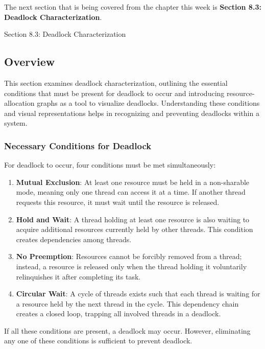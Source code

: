 The next section that is being covered from the chapter this week is \textbf{Section 8.3: Deadlock Characterization}.

\begin{notes}{Section 8.3: Deadlock Characterization}
    \subsection*{Overview}

    This section examines deadlock characterization, outlining the essential conditions that must be present for deadlock to occur and introducing resource-allocation graphs as a tool to visualize deadlocks. Understanding these conditions and visual representations helps in recognizing and preventing deadlocks within a system.
    
    \subsubsection*{Necessary Conditions for Deadlock}
    
    For deadlock to occur, four conditions must be met simultaneously:

    \begin{enumerate}
        \item \textbf{Mutual Exclusion}: At least one resource must be held in a non-sharable mode, meaning only one thread can access it at a time. If another thread requests this resource, it must wait until the resource is released.
        \item \textbf{Hold and Wait}: A thread holding at least one resource is also waiting to acquire additional resources currently held by other threads. This condition creates dependencies among threads.
        \item \textbf{No Preemption}: Resources cannot be forcibly removed from a thread; instead, a resource is released only when the thread holding it voluntarily relinquishes it after completing its task.
        \item \textbf{Circular Wait}: A cycle of threads exists such that each thread is waiting for a resource held by the next thread in the cycle. This dependency chain creates a closed loop, trapping all involved threads in a deadlock.
    \end{enumerate}
    
    If all these conditions are present, a deadlock may occur. However, eliminating any one of these conditions is sufficient to prevent deadlock.
    

\end{notes}
